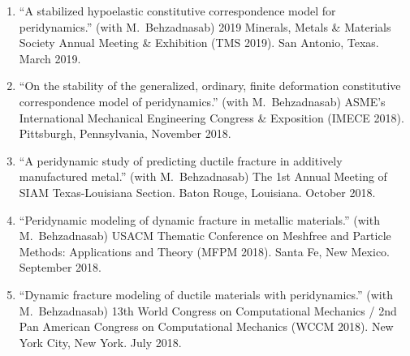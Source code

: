 \begin{enumerate}
  \item ``A stabilized hypoelastic constitutive correspondence model for peridynamics.'' (with M.\ Behzadnasab) 2019 Minerals, Metals \& Materials Society Annual Meeting \& Exhibition (TMS 2019). San Antonio, Texas. March 2019.
  \item ``On the stability of the generalized, ordinary, finite deformation constitutive correspondence model of peridynamics.'' (with M.\ Behzadnasab) ASME's International Mechanical Engineering Congress \& Exposition (IMECE 2018). Pittsburgh, Pennsylvania, November 2018.
  \item ``A peridynamic study of predicting ductile fracture in additively manufactured metal.'' (with M.\ Behzadnasab) The 1st Annual Meeting of SIAM Texas-Louisiana Section. Baton Rouge, Louisiana. October 2018. 
  \item ``Peridynamic modeling of dynamic fracture in metallic materials.'' (with M.\ Behzadnasab) USACM Thematic Conference on Meshfree and Particle Methods: Applications and Theory (MFPM 2018). Santa Fe, New Mexico. September 2018.
  \item ``Dynamic fracture modeling of ductile materials with peridynamics.'' (with M.\ Behzadnasab) 13th World Congress on Computational Mechanics / 2nd Pan American Congress on Computational Mechanics (WCCM 2018). New York City, New York. July 2018.
\end{enumerate}
\else
\ifdefined\ispdf
